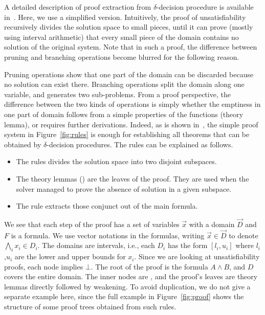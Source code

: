 A detailed description of proof extraction from $\delta$-decision procedure is available in~\cite{DBLP:conf/synasc/GaoKC14}.
Here, we use a simplified version. Intuitively, the proof of unsatisfiability recursively divides the solution space to small pieces, until it can prove (mostly using interval arithmetic) that every small piece of the domain contains no solution of the original system. Note that in such a proof, the difference between pruning and branching operations become blurred for the following reason.

Pruning operations show that one part of the domain can be discarded because no solution can exist there. Branching operations split the domain along one variable, and generates two sub-problems. From a proof perspective, the difference between the two kinds of operations is simply whether the emptiness in one part of domain follows from a simple properties of the functions (theory lemma), or requires further derivations. Indeed, as is shown in~\cite{DBLP:conf/synasc/GaoKC14}, the simple proof system in Figure~\ref{fig:rules} is enough for establishing all theorems that can be obtained by $\delta$-decision procedures. The rules can be explained as follows. 
\begin{itemize}
\item The \splt rules divides the solution space into two disjoint subspaces.
\item The theory lemmas (\thLem) are the leaves of the proof. They are used when the solver managed to prove the absence of solution in a given subspace.
\item The \weaken rule extracts those conjunct out of the main formula.
\end{itemize}
We see that each step of the proof has a set of variables $\vec x$ with a domain $\vec D$ and $F$ is a formula. We use vector notations in the formulas, writing $\vec x ∈ \vec D$ to denote $\bigwedge_i x_i ∈ D_i$. The domains are intervals, i.e., each $D_i$ has the form $[l_i,u_i]$ where $l_i$,$u_i$ are the lower and upper bounds for $x_i$. Since we are looking at unsatisfiability proofs, each node implies $⊥$. The root of the proof is the formula $A ∧ B$, and $D$ covers the entire domain. The inner nodes are \splt, and the proof's leaves are theory lemmas directly followed by weakening. To avoid duplication, we do not give a separate example here, since the full example in Figure~\ref{fig:proof} shows the structure of some proof trees obtained from such rules. 

